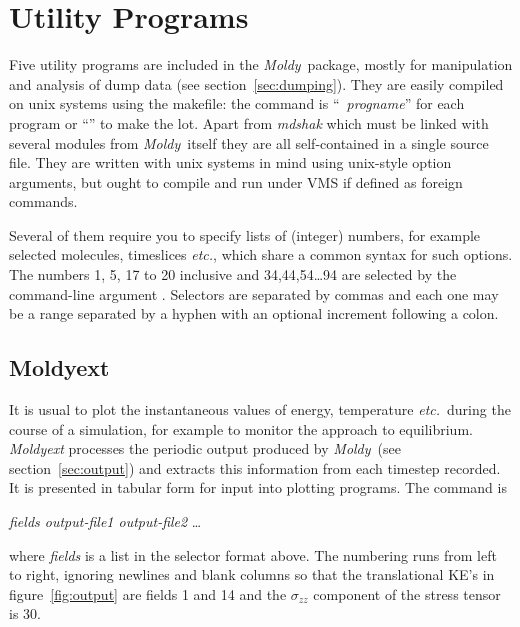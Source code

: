 \documentclass[a4paper,twoside]{report}
\newcommand{\moldy}{\emph{Moldy}}
\newcommand{\etc}{\emph{etc.}}
\begin{document}
\chapter{Utility Programs} %
Five utility programs are included in the \moldy\ package, mostly for
manipulation and analysis of dump data (see section~\ref{sec:dumping}).
They are easily compiled on unix systems using the makefile: the
command is ``~\emph{progname}'' for each program or
``'' to make the lot.  Apart from \emph{mdshak}
which must be linked with several modules from \moldy\ itself they are
all self-contained in a single source file.  They are written with
unix systems in mind using unix-style option arguments, but ought to
compile and run under VMS if defined as foreign commands.

Several of them require you to specify lists of (integer) numbers, for
example selected molecules, timeslices \etc, which share a common
syntax for such options. The numbers 1, 5, 17 to 20 inclusive and
34,44,54\ldots94 are selected by the command-line argument
\mbox{}.  Selectors are separated by
commas and each one may be a range separated by a hyphen with an
optional increment following a colon.

\section{Moldyext}%
It is usual to plot the instantaneous values of energy, temperature
\etc\ during the course of a simulation, for example to monitor the
approach to equilibrium.  \emph{Moldyext} processes the periodic
output produced by \moldy\ (see section~\ref{sec:output}) and extracts
this information from each timestep recorded.  It is presented in
tabular form for input into plotting programs.  The command is
\begin{center}
 \textit{fields output-file1 output-file2} \ldots
\end{center}
where \emph{fields} is a list in the selector format above.  The
numbering runs from left to right, ignoring newlines and blank columns
so that the translational KE's in figure~\ref{fig:output} are fields 1
and 14 and the $\sigma_{zz}$ component of the stress tensor is 30.
\end{document}
